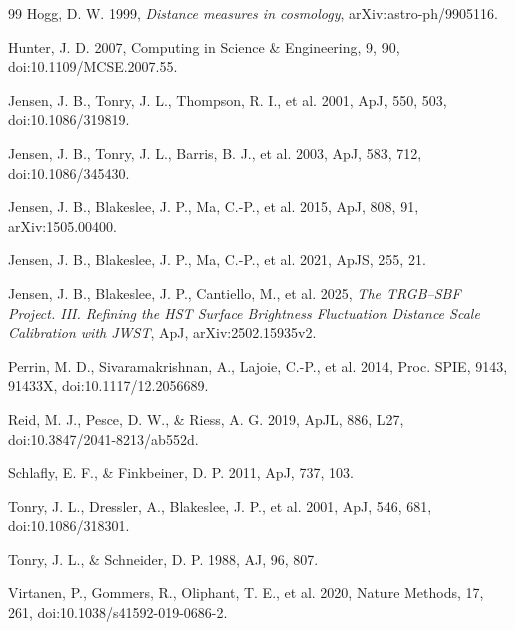 \documentclass[nodoi,nocopyright]{pas}
\begin{document}
\begin{thebibliography}{99}
Hogg, D. W. 1999, \emph{Distance measures in cosmology},
arXiv:astro-ph/9905116.

Hunter, J. D. 2007, Computing in Science \& Engineering, 9, 90,
doi:10.1109/MCSE.2007.55.

Jensen, J. B., Tonry, J. L., Thompson, R. I., et al. 2001,
ApJ, 550, 503, doi:10.1086/319819.

Jensen, J. B., Tonry, J. L., Barris, B. J., et al. 2003,
ApJ, 583, 712, doi:10.1086/345430.

Jensen, J. B., Blakeslee, J. P., Ma, C.-P., et al. 2015,
ApJ, 808, 91, arXiv:1505.00400.

Jensen, J. B., Blakeslee, J. P., Ma, C.-P., et al. 2021,
ApJS, 255, 21.

Jensen, J. B., Blakeslee, J. P., Cantiello, M., et al. 2025,
\emph{The TRGB--SBF Project. III. Refining the HST Surface Brightness
Fluctuation Distance Scale Calibration with JWST},
ApJ, arXiv:2502.15935v2.

Perrin, M. D., Sivaramakrishnan, A., Lajoie, C.-P., et al. 2014,
Proc. SPIE, 9143, 91433X, doi:10.1117/12.2056689.

Reid, M. J., Pesce, D. W., \& Riess, A. G. 2019,
ApJL, 886, L27, doi:10.3847/2041-8213/ab552d.

Schlafly, E. F., \& Finkbeiner, D. P. 2011, ApJ, 737, 103.

Tonry, J. L., Dressler, A., Blakeslee, J. P., et al. 2001,
ApJ, 546, 681, doi:10.1086/318301.

Tonry, J. L., \& Schneider, D. P. 1988, AJ, 96, 807.

Virtanen, P., Gommers, R., Oliphant, T. E., et al. 2020,
Nature Methods, 17, 261, doi:10.1038/s41592-019-0686-2.

\end{thebibliography}

\label{LastArticlePage}
\end{document}
